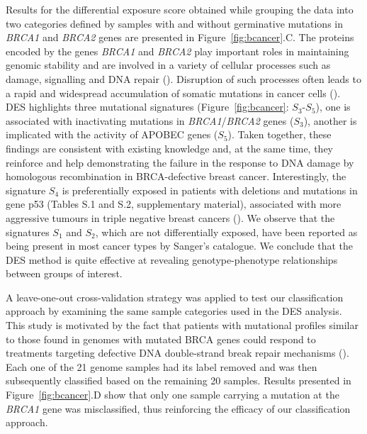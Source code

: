 \documentclass{bioinfo}
\begin{document}
Results for the differential exposure score obtained while grouping
the data into two categories defined by samples with and without
germinative mutations in \emph{BRCA1} and \emph{BRCA2} genes are
presented in Figure~\ref{fig:bcancer}.C. The proteins encoded by the
genes \emph{BRCA1} and \emph{BRCA2} play important roles in
maintaining genomic stability and are involved in a variety of
cellular processes such as damage, signalling and DNA repair
(\citealp{LY}). Disruption of such processes often leads to a rapid
and widespread accumulation of somatic mutations in cancer cells
(\citealp{Ash}). DES highlights three mutational signatures
(Figure~\ref{fig:bcancer}: $S_3$-$S_5$), one is associated with
inactivating mutations in \emph{BRCA1}/\emph{BRCA2} genes ($S_{3}$),
another is implicated with the activity of APOBEC genes ($S_5$). Taken
together, these findings are consistent with existing knowledge and,
at the same time, they reinforce and help demonstrating the failure in
the response to DNA damage by homologous recombination in
BRCA-defective breast cancer. Interestingly, the signature $S_4$ is
preferentially exposed in patients with deletions and mutations in
gene p53 (Tables S.1 and S.2, supplementary material), associated with
more aggressive tumours in triple negative breast cancers
(\citealp{DP}). We observe that the signatures $S_1$ and
$S_2$, which are not differentially exposed, have been reported as
being present in most cancer types by Sanger's catalogue. We conclude
that the DES method is quite effective at revealing genotype-phenotype 
relationships between groups of interest.

A leave-one-out cross-validation strategy was applied to test our
classification approach by examining the same sample categories used
in the DES analysis. This study is motivated by the fact that patients
with mutational profiles similar to those found in genomes with
mutated BRCA genes could respond to treatments targeting defective DNA
double-strand break repair mechanisms (\citealp{Ash}).  Each one of
the 21 genome samples had its label removed and was then subsequently
classified based on the remaining 20 samples.  Results presented in
Figure~\ref{fig:bcancer}.D show that only one sample carrying a
mutation at the \emph{BRCA1} gene was misclassified, thus reinforcing 
the efficacy of our classification approach.
\end{document}

